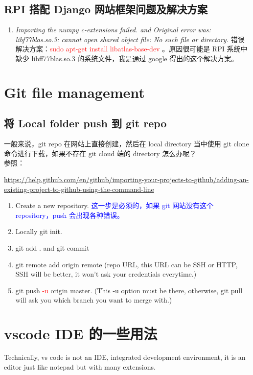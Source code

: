 \documentclass[UTF8,fancyhdr,a4paper]{ctexart}
\begin{document}
\subsection{RPI 搭配 Django 网站框架问题及解决方案}
\begin{enumerate}
      \item \emph{Importing the numpy c-extensions failed. and Original error was: libf77blas.so.3: cannot open shared object file: No such file or directory.} 错误解决方案：\textcolor{red}{sudo apt-get install libatlas-base-dev} 。原因很可能是 RPI 系统中缺少 libff77blas.so.3 的系统文件，我是通过 google 得出的这个解决方案。
\end{enumerate}






\newpage
\section{Git file management}
\subsection{将 Local folder push 到 git repo}
一般来说，git repo 在网站上直接创建，然后在 local directory 当中使用 git clone 命令进行下载，如果不存在 git cloud 端的 directory 怎么办呢？\\
参照：\begin{sloppypar}\url{https://help.github.com/en/github/importing-your-projects-to-github/adding-an-existing-project-to-github-using-the-command-line}\end{sloppypar}
\begin{enumerate}
      \item Create a new repository. \textcolor{blue}{这一步是必须的，如果 git 网站没有这个 repository，push 会出现各种错误。}
      \item Locally git init.
      \item git add . and git commit
      \item git remote add origin remote (repo URL, this URL can be SSH or HTTP, SSH will be better, it won't ask your credentials everytime.)
      \item git push \textcolor{red}{-u} origin master. (This -u option must be there, otherwise, git pull will ask you which branch you want to merge with.)
\end{enumerate}


\newpage
\section{vscode IDE 的一些用法}
Technically, vs code is not an IDE, integrated development environment, it is an editor just like notepad but with many extensions.
\end{document}
